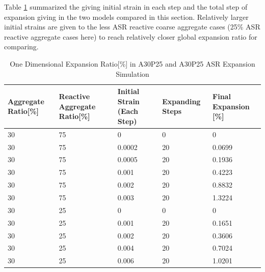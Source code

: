 Table \ref{table:A30P25vsA30P75_EXP} summarized the giving initial strain in each step and the total step of expansion giving in the two models compared in this section. Relatively larger initial strains are given to the less ASR reactive coarse aggregate cases (25\% ASR reactive aggregate cases here) to reach relatively closer global expansion ratio for comparing.

\begin{table}[ht!]
  \caption{One Dimensional Expansion Ratio[\%] in A30P25 and A30P25 ASR Expansion Simulation}
\centering
\begin{tabular}{ ||p{2cm}|p{2cm}|p{2cm}|p{2cm}|p{2cm}|| }
 \hline
 Aggregate Ratio[\%] &  Reactive Aggregate Ratio[\%]  & Initial Strain (Each Step) & Expanding Steps & Final Expansion [\%] \\ [0.5ex]
 \hline\hline
 30 & 75 & 0 & 0 & 0\\
 30 & 75 & 0.0002 & 20 & 0.0699\\
 30 & 75 & 0.0005 & 20 & 0.1936\\
 30 & 75 & 0.001 & 20 & 0.4223\\
 30 & 75 & 0.002 & 20 & 0.8832\\
 30 & 75 & 0.003 & 20 & 1.3224\\

 30 & 25 & 0 & 0 & 0\\
 30 & 25 & 0.001 & 20 & 0.1651\\
 30 & 25 & 0.002 & 20 & 0.3606\\
 30 & 25 & 0.004 & 20 & 0.7024\\
 30 & 25 & 0.006 & 20 & 1.0201\\
 \hline
\end{tabular}

\label{table:A30P25vsA30P75_EXP}
\end{table}



